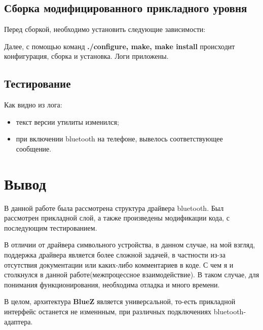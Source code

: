 \subsection{Сборка модифицированного прикладного уровня}
Перед сборкой, необходимо установить следующие зависимости:

Далее, с помощью команд \textbf{./configure, make, make install} происходит конфигурация, сборка и установка. Логи приложены.


\subsection{Тестирование}

Как видно из лога:
\begin{itemize}
\item текст версии утилиты изменился;
\item при включении bluetooth на телефоне, вывелось соответствующее сообщение.
\end{itemize}


\clearpage
{}
\section*{Вывод}
В данной работе была рассмотрена структура драйвера bluetooth. Был рассмотрен прикладной слой, а также произведены модификации кода, с последующим тестированием.

В отличии от драйвера символьного устройства, в данном случае, на мой взгляд, поддержка драйвера является более сложной задачей, в частности из-за отсутствия документации или каких-либо комментариев в коде. С чем я и столкнулся в данной работе(межпроцессное взаимодействие). В таком случае, для понимания функционирования, необходима отладка и много времени.

В целом, архитектура \textbf{BlueZ} является универсальной, то-есть прикладной интерфейс останется не изменнным, при различных подключениях bluetooth-адаптера.


\nocite{BlueZ1}
\nocite{BlueZ2}
\nocite{BlueZ3}
\nocite{Bluetooth}

\clearpage
{}



